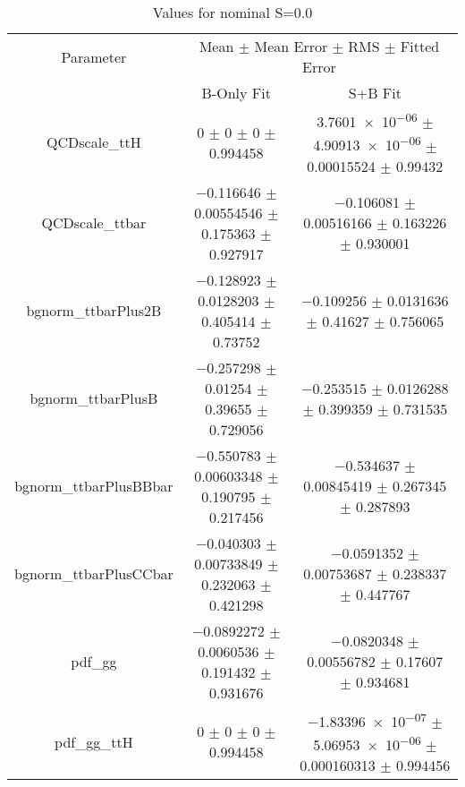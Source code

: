 \begin{table}
\centering
\caption{Values for nominal S=0.0}
\begin{tabular}{ccc}
\toprule
Parameter & \multicolumn{2}{c}{Mean $\pm$ Mean Error $\pm$ RMS $\pm$ Fitted Error}\\
 & B-Only Fit & S+B Fit\\
\midrule
QCDscale\_ttH & \num{0} $\pm$ \num{0} $\pm$ \num{0} $\pm$ \num{0.994458} & \num{3.7601e-06} $\pm$ \num{4.90913e-06} $\pm$ \num{0.00015524} $\pm$ \num{0.99432}\\
QCDscale\_ttbar & \num{-0.116646} $\pm$ \num{0.00554546} $\pm$ \num{0.175363} $\pm$ \num{0.927917} & \num{-0.106081} $\pm$ \num{0.00516166} $\pm$ \num{0.163226} $\pm$ \num{0.930001}\\
bgnorm\_ttbarPlus2B & \num{-0.128923} $\pm$ \num{0.0128203} $\pm$ \num{0.405414} $\pm$ \num{0.73752} & \num{-0.109256} $\pm$ \num{0.0131636} $\pm$ \num{0.41627} $\pm$ \num{0.756065}\\
bgnorm\_ttbarPlusB & \num{-0.257298} $\pm$ \num{0.01254} $\pm$ \num{0.39655} $\pm$ \num{0.729056} & \num{-0.253515} $\pm$ \num{0.0126288} $\pm$ \num{0.399359} $\pm$ \num{0.731535}\\
bgnorm\_ttbarPlusBBbar & \num{-0.550783} $\pm$ \num{0.00603348} $\pm$ \num{0.190795} $\pm$ \num{0.217456} & \num{-0.534637} $\pm$ \num{0.00845419} $\pm$ \num{0.267345} $\pm$ \num{0.287893}\\
bgnorm\_ttbarPlusCCbar & \num{-0.040303} $\pm$ \num{0.00733849} $\pm$ \num{0.232063} $\pm$ \num{0.421298} & \num{-0.0591352} $\pm$ \num{0.00753687} $\pm$ \num{0.238337} $\pm$ \num{0.447767}\\
pdf\_gg & \num{-0.0892272} $\pm$ \num{0.0060536} $\pm$ \num{0.191432} $\pm$ \num{0.931676} & \num{-0.0820348} $\pm$ \num{0.00556782} $\pm$ \num{0.17607} $\pm$ \num{0.934681}\\
pdf\_gg\_ttH & \num{0} $\pm$ \num{0} $\pm$ \num{0} $\pm$ \num{0.994458} & \num{-1.83396e-07} $\pm$ \num{5.06953e-06} $\pm$ \num{0.000160313} $\pm$ \num{0.994456}\\
\bottomrule
\end{tabular}
\end{table}